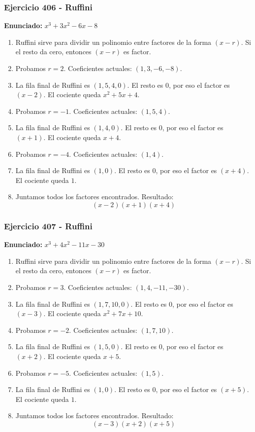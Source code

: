 \documentclass[11pt,a4paper]{article}
\begin{document}
\vspace{0.2cm}
\subsubsection*{Ejercicio 406 - Ruffini}
\textbf{Enunciado:} $ x^{3} + 3 x^{2} - 6 x - 8 $\par
\begin{enumerate}[leftmargin=2em]
\item Ruffini sirve para dividir un polinomio entre factores de la forma \((x-r)\). Si el resto da cero, entonces \((x-r)\) es factor.
\item Probamos \(r=2\). Coeficientes actuales: \((1, 3, -6, -8)\).
\item La fila final de Ruffini es \((1, 5, 4, 0)\). El resto es \(0\), por eso el factor es \((x-2)\). El cociente queda \(x^{2} + 5 x + 4\).
\item Probamos \(r=-1\). Coeficientes actuales: \((1, 5, 4)\).
\item La fila final de Ruffini es \((1, 4, 0)\). El resto es \(0\), por eso el factor es \((x+1)\). El cociente queda \(x + 4\).
\item Probamos \(r=-4\). Coeficientes actuales: \((1, 4)\).
\item La fila final de Ruffini es \((1, 0)\). El resto es \(0\), por eso el factor es \((x+4)\). El cociente queda \(1\).
\item Juntamos todos los factores encontrados. Resultado: \[\boxed{\left(x - 2\right) \left(x + 1\right) \left(x + 4\right)}\]
\end{enumerate}

\vspace{0.2cm}
\subsubsection*{Ejercicio 407 - Ruffini}
\textbf{Enunciado:} $ x^{3} + 4 x^{2} - 11 x - 30 $\par
\begin{enumerate}[leftmargin=2em]
\item Ruffini sirve para dividir un polinomio entre factores de la forma \((x-r)\). Si el resto da cero, entonces \((x-r)\) es factor.
\item Probamos \(r=3\). Coeficientes actuales: \((1, 4, -11, -30)\).
\item La fila final de Ruffini es \((1, 7, 10, 0)\). El resto es \(0\), por eso el factor es \((x-3)\). El cociente queda \(x^{2} + 7 x + 10\).
\item Probamos \(r=-2\). Coeficientes actuales: \((1, 7, 10)\).
\item La fila final de Ruffini es \((1, 5, 0)\). El resto es \(0\), por eso el factor es \((x+2)\). El cociente queda \(x + 5\).
\item Probamos \(r=-5\). Coeficientes actuales: \((1, 5)\).
\item La fila final de Ruffini es \((1, 0)\). El resto es \(0\), por eso el factor es \((x+5)\). El cociente queda \(1\).
\item Juntamos todos los factores encontrados. Resultado: \[\boxed{\left(x - 3\right) \left(x + 2\right) \left(x + 5\right)}\]
\end{enumerate}
\end{document}
